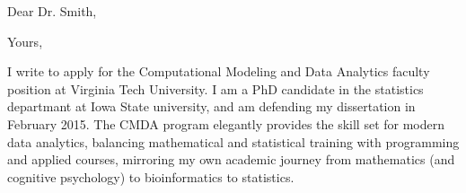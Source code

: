 \documentclass[11pt,letterpaper,sans,unicode]{moderncv}        %
\begin{document}
\date{November 5, 2014}
\opening{Dear Dr. Smith,}
\closing{Yours,}
\makelettertitle
% 

I write to apply for the Computational Modeling and Data Analytics faculty position at Virginia Tech University. I am a PhD candidate in the statistics departmant at Iowa State university, and am defending my dissertation in February 2015. The CMDA program elegantly provides the skill set for modern data analytics, balancing mathematical and statistical training with programming and applied courses, mirroring my own academic journey from mathematics (and cognitive psychology) to bioinformatics to statistics. 



\end{document}
